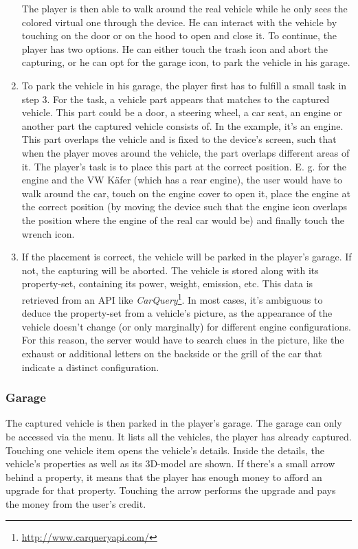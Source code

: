 \begin{enumerate}
The player is then able to walk around the real vehicle while he only sees the colored virtual one through the device. He can interact with the vehicle by touching on the door or on the hood to open and close it. To continue, the player has two options. He can either touch the trash icon and abort the capturing, or he can opt for the garage icon, to park the vehicle in his garage.
  \item To park the vehicle in his garage, the player first has to fulfill a small task in step 3. For the task, a vehicle part appears that matches to the captured vehicle. This part could be a door, a steering wheel, a car seat, an engine or another part the captured vehicle consists of. In the example, it's an engine. This part overlaps the vehicle and is fixed to the device's screen, such that when the player moves around the vehicle, the part overlaps different areas of it. The player's task is to place this part at the correct position. E. g. for the engine and the VW K\"afer (which has a rear engine), the user would have to walk around the car, touch on the engine cover to open it, place the engine at the correct position (by moving the device such that the engine icon overlaps the position where the engine of the real car would be) and finally touch the wrench icon.
  \item If the placement is correct, the vehicle will be parked in the player's garage. If not, the capturing will be aborted. The vehicle is stored along with its property-set, containing its power, weight, emission, etc. This data is retrieved from an API like \emph{CarQuery}\footnote{\url{http://www.carqueryapi.com/}}. In most cases, it's ambiguous to deduce the property-set from a vehicle's picture, as the appearance of the vehicle doesn't change (or only marginally) for different engine configurations. For this reason, the server would have to search clues in the picture, like the exhaust or additional letters on the backside or the grill of the car that indicate a distinct configuration.
\end{enumerate}

\subsubsection{Garage}
The captured vehicle is then parked in the player's garage. The garage can only be accessed via the menu. It lists all the vehicles, the player has already captured. Touching one vehicle item opens the vehicle's details. Inside the details, the vehicle's properties as well as its 3D-model are shown. If there's a small arrow behind a property, it means that the player has enough money to afford an upgrade for that property. Touching the arrow performs the upgrade and pays the money from the user's credit.

